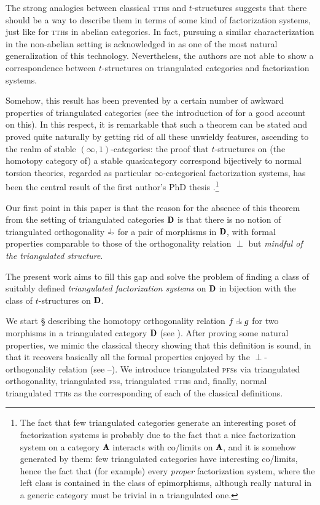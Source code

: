 The strong analogies between classical \textsc{tth}s and $t$-structures suggests that there should be a way to describe them in terms of some kind of factorization systems, just like for \textsc{tth}s in abelian categories. In fact, pursuing a similar characterization in the non-abelian setting is acknowledged in \cite{rosicky2007factorization} as one of the most natural generalization of this technology. Nevertheless, the authors are not able to show a correspondence between $t$-structures on triangulated categories and factorization systems.

Somehow, this result has been prevented by a certain number of awkward properties of triangulated categories (see the introduction of \cite{maltsiniotis:k-theory} for a good account on this). In this respect, it is remarkable that such a theorem can be stated and proved quite naturally by getting rid of all these unwieldy features, ascending to the realm of stable $(\infty,1)$\hyp{}categories: the proof that $t$-structures on (the homotopy category of) a stable quasicategory correspond bijectively to normal torsion theories, regarded as particular $\infty$\hyp{}categorical factorization systems, has been the central result of the first author's PhD thesis \cite{tstructures}.\footnote{The fact that few triangulated categories generate an interesting poset of factorization systems is probably due to the fact that a nice factorization system on a category $\cate{A}$ interacts with co/limits on $\cate{A}$, and it is somehow generated by them: few triangulated categories have interesting co/limits, hence the fact that (for example) every \emph{proper} factorization system, where the left class is contained in the class of epimorphisms, although really natural in a generic category must be trivial in a triangulated one.}

Our first point in this paper is that the reason for the absence of this theorem from the setting of triangulated categories $\cD$ is that there is no notion of triangulated orthogonality $\horth$ for a pair of morphisms in $\cD$, with formal properties comparable to those of the orthogonality relation $\perp$ but \emph{mindful of the triangulated structure}.

The present work aims to fill this gap and solve the problem of finding a class of suitably defined \emph{triangulated factorization systems} on $\cD$ in bijection with the class of $t$-structures on $\cD$.

We start § describing the homotopy orthogonality relation $f\horth g$ for two morphisms in a triangulated category $\cD$ (see \adef{}). After proving some natural properties, we mimic the classical theory showing that this definition is sound, in that it recovers basically all the formal properties enjoyed by the $\perp$-orthogonality relation (see --). We introduce triangulated \textsc{pfs}s via triangulated orthogonality, triangulated \textsc{fs}s, triangulated \textsc{tth}s and, finally, normal triangulated \textsc{tth}s as the corresponding of each of the classical definitions.

